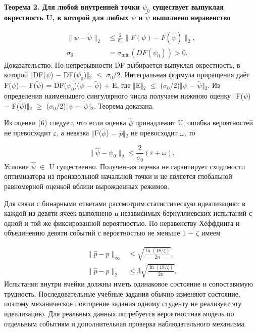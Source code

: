 \documentclass[blind]{psta}
\begin{document}
\par\medskip\noindent\textbf{Теорема 2. Для любой внутренней точки $\psi_{0}$ существует выпуклая окрестность U, в которой для любых $\psi$ и $\widetilde{\psi}$ выполнено неравенство}\par\smallskip
\begin{equation}
\begin{aligned}\|\psi-\widetilde\psi\|_2&\le\frac{2}{\sigma_0}\|F(\psi)-F(\widetilde\psi)\|_2,\\\sigma_0&=\sigma_{\min}(DF(\psi_0))>0.\end{aligned}
\tag{6}
\label{eq:6}
\end{equation}
Доказательство. По непрерывности DF выбирается выпуклая окрестность, в которой $\Vert$DF($\psi$) $-$ DF($\psi_{0}$)$\Vert$$_{2}$ $\le$ $\sigma_{0}$/2. Интегральная формула приращения даёт F($\psi$) $-$ F($\widetilde{\psi}$) = DF($\psi_{0}$)($\psi$ $-$ $\widetilde{\psi}$) + E, где $\Vert$E$\Vert$$_{2}$ $\le$ ($\sigma_{0}$/2)$\Vert$$\psi$ $-$ $\widetilde{\psi}$$\Vert$$_{2}$. Из определения наименьшего сингулярного числа получаем нижнюю оценку $\Vert$F($\psi$) $-$ F($\widetilde{\psi}$)$\Vert$$_{2}$ $\ge$ ($\sigma_{0}$/2)$\Vert$$\psi$ $-$ $\widetilde{\psi}$$\Vert$$_{2}$. Теорема доказана.

Из оценки (6) следует, что если оценка $\widehat{\psi}$ принадлежит U, ошибка вероятностей не превосходит $\varepsilon$, а невязка $\Vert$F($\widehat{\psi}$) $-$ $\widehat{p}$$\Vert$$_{2}$ не превосходит $\omega$, то

\[
\|\widehat\psi-\psi_0\|_2\le\frac{2}{\sigma_0}(\varepsilon+\omega).
\]
Условие $\widehat{\psi}$ $\in$ U существенно. Полученная оценка не гарантирует сходимости оптимизатора из произвольной начальной точки и не является глобальной равномерной оценкой вблизи вырожденных режимов.

Для связи с бинарными ответами рассмотрим статистическую идеализацию: в каждой из девяти ячеек выполнено n независимых бернуллиевских испытаний с одной и той же фиксированной вероятностью. По неравенству Хёффдинга \cite{ref14} и объединению девяти событий с вероятностью не меньше 1 $-$ $\zeta$ имеем

\[
\begin{aligned}\|\widehat p-p\|_\infty&\le\sqrt{\frac{\ln(18/\zeta)}{2n}},\\\|\widehat p-p\|_2&\le3\sqrt{\frac{\ln(18/\zeta)}{2n}}.\end{aligned}
\]
Испытания внутри ячейки должны иметь одинаковое состояние и сопоставимую трудность. Последовательные учебные задания обычно изменяют состояние, поэтому механическое повторение задания одному студенту не реализует эту идеализацию. Для реальных данных потребуется вероятностная модель по отдельным событиям и дополнительная проверка наблюдательного механизма.
\end{document}
